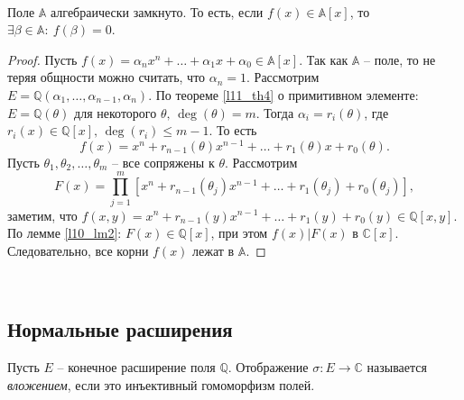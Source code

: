 \begin{theorem} \label{l12_th5}~\\
	Поле $\mathbb{A}$ алгебраически замкнуто. То есть, если $f(x) \in \mathbb{A}[x]$, то $\exists \beta \in \mathbb{A}: \ f(\beta) = 0$.
\end{theorem}
\begin{proof}
	Пусть $f(x) = \alpha_nx^n + \dots + \alpha_1x + \alpha_0 \in \mathbb{A}[x]$. Так как $\mathbb{A}$ -- поле, то не теряя общности можно считать, что $\alpha_n = 1$. Рассмотрим $E = \mathbb{Q}\left( \alpha_1, \dots, \alpha_{n-1}, \alpha_n \right)$. По теореме \ref{l11_th4} о примитивном элементе: $E = \mathbb{Q}(\theta)$ для некоторого $\theta, \, \deg(\theta)=m$. Тогда $\alpha_i = r_i(\theta)$, где $r_i(x) \in \mathbb{Q}[x], \, \deg(r_i) \leq m-1$. То есть
	$$f(x) = x^n + r_{n-1}(\theta) x^{n-1} + \dots + r_1(\theta)x + r_0(\theta).$$
	Пусть $\theta_1, \theta_2, \dots, \theta_m$ -- все сопряжены к $\theta$. Рассмотрим
	$$F(x) = \prod\limits_{j=1}^m \left[ x^n + r_{n-1}(\theta_j)x^{n-1} + \dots + r_1(\theta_j) + r_0(\theta_j) \right],$$
	заметим, что $f(x,y) = x^n + r_{n-1}(y)x^{n-1} + \dots + r_1(y) + r_0(y) \in \mathbb{Q}[x,y]$. По лемме \ref{l10_lm2}: 
	$F(x) \in \mathbb{Q}[x]$, при этом $f(x) \vert F(x)$ в $\mathbb{C}[x]$. 
	Следовательно, все корни $f(x)$ лежат в $\mathbb{A}$.
\end{proof}~\\

\subsection{Нормальные расширения}
\begin{definition}
	Пусть $E$ -- конечное расширение поля $\mathbb{Q}$. Отображение $\sigma\colon E \to \mathbb{C}$ называется \textit{вложением}, если это инъективный гомоморфизм полей.
\end{definition}

